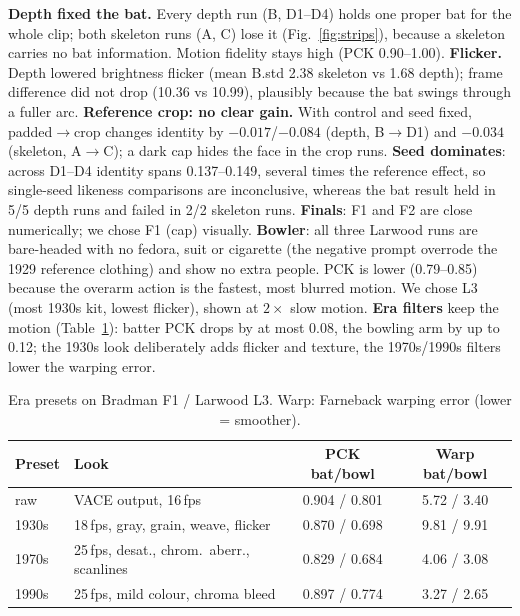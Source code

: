 \textbf{Depth fixed the bat.} Every depth run (B, D1--D4) holds one proper bat for the whole clip; both skeleton runs
(A, C) lose it (Fig.~\ref{fig:strips}), because a skeleton carries no bat information. Motion fidelity stays high
(PCK 0.90--1.00). \textbf{Flicker.} Depth lowered brightness flicker (mean B.std 2.38 skeleton vs 1.68 depth); frame
difference did not drop (10.36 vs 10.99), plausibly because the bat swings through a fuller arc.
\textbf{Reference crop: no clear gain.} With control and seed fixed, padded$\rightarrow$crop changes identity by
$-0.017$/$-0.084$ (depth, B$\rightarrow$D1) and $-0.034$ (skeleton, A$\rightarrow$C); a dark cap hides the face in the
crop runs. \textbf{Seed dominates}: across D1--D4 identity spans 0.137--0.149, several times the reference effect, so
single-seed likeness comparisons are inconclusive, whereas the bat result held in 5/5 depth runs and failed in 2/2
skeleton runs. \textbf{Finals}: F1 and F2 are close numerically; we chose F1 (cap) visually.
\textbf{Bowler}: all three Larwood runs are bare-headed with no fedora, suit or cigarette (the negative prompt overrode
the 1929 reference clothing) and show no extra people. PCK is lower (0.79--0.85) because the overarm action is the
fastest, most blurred motion. We chose L3 (most 1930s kit, lowest flicker), shown at $2{\times}$ slow motion.
\textbf{Era filters} keep the motion (Table~\ref{tab:eras}): batter PCK drops by at most 0.08, the bowling arm by up to
0.12; the 1930s look deliberately adds flicker and texture, the 1970s/1990s filters lower the warping error.

\begin{table}[t]
\centering\small
\setlength{\tabcolsep}{2.4pt}
\begin{tabular}{llcc}
\toprule
Preset & Look & PCK bat/bowl & Warp bat/bowl\\
\midrule
raw & VACE output, 16\,fps & 0.904 / 0.801 & 5.72 / 3.40\\
1930s & 18\,fps, gray, grain, weave, flicker & 0.870 / 0.698 & 9.81 / 9.91\\
1970s & 25\,fps, desat., chrom.\ aberr., scanlines & 0.829 / 0.684 & 4.06 / 3.08\\
1990s & 25\,fps, mild colour, chroma bleed & 0.897 / 0.774 & 3.27 / 2.65\\
\bottomrule
\end{tabular}
\caption{Era presets on Bradman F1 / Larwood L3. Warp: Farneback warping error (lower = smoother).}
\label{tab:eras}
\end{table}

